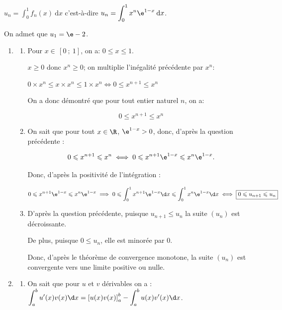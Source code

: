 \begin{center}$u_n = \displaystyle\int_0^1 f_n(x) \:\text{d}x$ \quad  c'est-à-dire \quad $u_n = \displaystyle\int_0^1 x^n \e^{1-x} \: \text{d}x$.\end{center}

On admet que $u_1 = \e - 2$.

\begin{enumerate}
	\item 
	
	\begin{enumerate}
	\item 	Pour $x \in \, [0~;~1]$, on a: $0\leqslant x \leqslant 1$.

$x\geqslant 0$ donc $x^n\geqslant 0$; on multiplie l'inégalité précédente par $x^n$:

$0\times x^n \leqslant x \times x^n  \leqslant 1 \times x^n 
\iff 0 \leqslant x^{n+1} \leqslant x^n$
	
On a donc démontré que pour tout entier naturel $n$, on a:

\[\boxed{0 \leqslant x^{n+1} \leqslant x^n}\]


		\item On sait que pour tout $x \in \R$, $\e^{1-x} > 0$, donc, d'après la question précédente :

\[0 \leqslant x^{n+1} \leqslant x^{n} \iff 0 \leqslant x^{n+1}\e^{1-x} \leqslant x^{n}\e^{1-x}.\]
		
		Donc, d'après la positivité de l'intégration :

\[0 \leqslant x^{n+1}\e^{1-x} \leqslant x^{n}\e^{1-x} \implies 0 \leqslant \int_{0}^{1}x^{n+1}\e^{1-x}\d x \leqslant \int_{0}^{1}x^{n}\e^{1-x}\d x \iff \boxed{0 \leqslant u_{n+1} \leqslant u_{n}}\]

		\item D'après la question précédente, puisque $u_{n+1} \leqslant u_{n}$ la suite $\left(u_{n}\right)$ est décroissante.
		
De plus, puisque $0 \leqslant u_{n}$, elle est minorée par $0$. 

Donc, d'après le théorème de convergence monotone, la suite $\left(u_{n}\right)$ est convergente vers une limite positive ou nulle.
	\end{enumerate}
	
	\item
	\begin{enumerate}
		\item On sait que pour $u$ et $v$ dérivables on a : $\displaystyle\int_{a}^{b}u'(x)v(x)\d x = \left[u(x)v(x)\right]_{a}^{b} - \displaystyle\int_{a}^{b}u(x)v'(x)\d x$.


\end{enumerate}
\end{enumerate}
